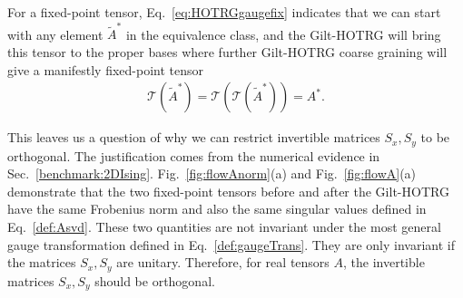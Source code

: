 \documentclass[aps,prb,reprint,superscriptaddress]{revtex4-2}
\begin{document}
For a fixed-point tensor, Eq.~\eqref{eq:HOTRGgaugefix} indicates that we
can start with any element $\tilde{A}^*$ in the equivalence class, and
the Gilt-HOTRG will bring this tensor to the proper bases where further
Gilt-HOTRG coarse graining will give a manifestly fixed-point tensor
%
\begin{align}\label{eq:GiltHOTRGfixT}
    \mathcal{T}(\tilde{A}^*) =
    \mathcal{T}\left(\mathcal{T}(\tilde{A}^*)  \right) = A^*.
\end{align}
%

This leaves us a question of why we can restrict invertible matrices
$S_x, S_y$ to be orthogonal. The justification comes from the
numerical evidence in Sec.~\ref{benchmark:2DIsing}.
Fig.~\ref{fig:flowAnorm}(a) and Fig.~\ref{fig:flowA}(a) demonstrate
that the two fixed-point tensors before and after the Gilt-HOTRG
have the same Frobenius norm and also the same singular values defined
in Eq.~\eqref{def:Asvd}. These two quantities are not invariant under
the most general gauge transformation defined in
Eq.~\eqref{def:gaugeTrans}. They are only invariant if the matrices
$S_x,S_y$ are unitary. Therefore, for real tensors $A$, the invertible
matrices $S_x,S_y$ should be orthogonal.
%
\end{document}
